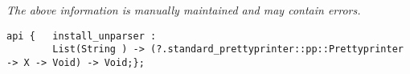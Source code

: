 \label{pkg:compiler\_unparse\_table}

{\tiny \it The above information is manually maintained and may contain errors.}
\begin{verbatim}
api {   install_unparser :
        List(String ) -> (?.standard_prettyprinter::pp::Prettyprinter -> X -> Void) -> Void;};
\end{verbatim}
